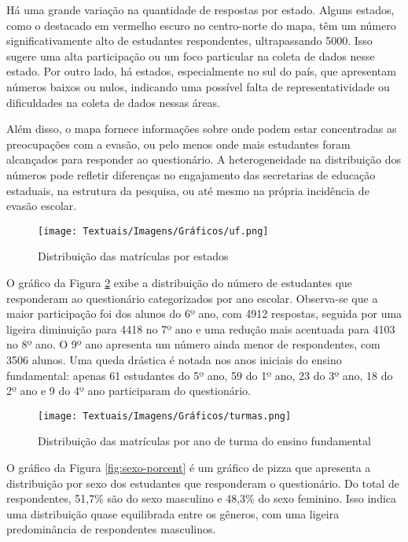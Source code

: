 Há uma grande variação na quantidade de respostas por estado. Alguns estados, como o destacado em vermelho escuro no centro-norte do mapa, têm um número significativamente alto de estudantes respondentes, ultrapassando 5000. Isso sugere uma alta participação ou um foco particular na coleta de dados nesse estado. Por outro lado, há estados, especialmente no sul do país, que apresentam números baixos ou nulos, indicando uma possível falta de representatividade ou dificuldades na coleta de dados nessas áreas.

Além disso, o mapa fornece informações sobre onde podem estar concentradas as preocupações com a evasão, ou pelo menos onde mais estudantes foram alcançados para responder ao questionário. A heterogeneidade na distribuição dos números pode refletir diferenças no engajamento das secretarias de educação estaduais, na estrutura da pesquisa, ou até mesmo na própria incidência de evasão escolar.

\begin{figure}[ht!]
    \centering
    \caption{Distribuição das matrículas por estados}
    \texttt{[image: Textuais/Imagens/Gráficos/uf.png]}
    \label{fig:uf}
\end{figure}

O gráfico da Figura \ref{fig:turmas} exibe a distribuição do número de estudantes que responderam ao questionário categorizados por ano escolar. Observa-se que a maior participação foi dos alunos do 6º ano, com 4912 respostas, seguida por uma ligeira diminuição para 4418 no 7º ano e uma redução mais acentuada para 4103 no 8º ano. O 9º ano apresenta um número ainda menor de respondentes, com 3506 alunos. Uma queda drástica é notada nos anos iniciais do ensino fundamental: apenas 61 estudantes do 5º ano, 59 do 1º ano, 23 do 3º ano, 18 do 2º ano e 9 do 4º ano participaram do questionário.

\begin{figure}[ht!]
    \centering
    \caption{Distribuição das matrículas por ano de turma do ensino fundamental}
    \texttt{[image: Textuais/Imagens/Gráficos/turmas.png]}
    \label{fig:turmas}
\end{figure}

O gráfico da Figura \ref{fig:sexo-porcent} é um gráfico de pizza que apresenta a distribuição por sexo dos estudantes que responderam o questionário. Do total de respondentes, 51,7\% são do sexo masculino e 48,3\% do sexo feminino. Isso indica uma distribuição quase equilibrada entre os gêneros, com uma ligeira predominância de respondentes masculinos. 

